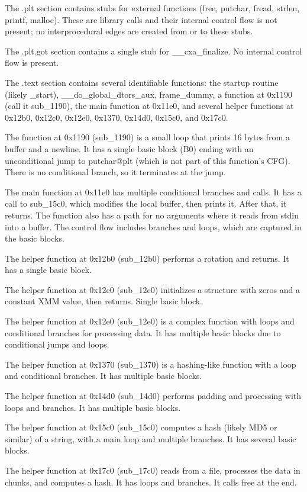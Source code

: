 The .plt section contains stubs for external functions (free, putchar, fread, strlen, printf, malloc). These are library calls and their internal control flow is not present; no interprocedural edges are created from or to these stubs.

The .plt.got section contains a single stub for \_\_cxa\_finalize. No internal control flow is present.

The .text section contains several identifiable functions: the startup routine (likely \_start), \_\_do\_global\_dtors\_aux, frame\_dummy, a function at 0x1190 (call it sub\_1190), the main function at 0x11e0, and several helper functions at 0x12b0, 0x12c0, 0x12e0, 0x1370, 0x14d0, 0x15c0, and 0x17c0.

The function at 0x1190 (sub\_1190) is a small loop that prints 16 bytes from a buffer and a newline. It has a single basic block (B0) ending with an unconditional jump to putchar@plt (which is not part of this function's CFG). There is no conditional branch, so it terminates at the jump.

The main function at 0x11e0 has multiple conditional branches and calls. It has a call to sub\_15c0, which modifies the local buffer, then prints it. After that, it returns. The function also has a path for no arguments where it reads from stdin into a buffer. The control flow includes branches and loops, which are captured in the basic blocks.

The helper function at 0x12b0 (sub\_12b0) performs a rotation and returns. It has a single basic block.

The helper function at 0x12c0 (sub\_12c0) initializes a structure with zeros and a constant XMM value, then returns. Single basic block.

The helper function at 0x12e0 (sub\_12e0) is a complex function with loops and conditional branches for processing data. It has multiple basic blocks due to conditional jumps and loops.

The helper function at 0x1370 (sub\_1370) is a hashing-like function with a loop and conditional branches. It has multiple basic blocks.

The helper function at 0x14d0 (sub\_14d0) performs padding and processing with loops and branches. It has multiple basic blocks.

The helper function at 0x15c0 (sub\_15c0) computes a hash (likely MD5 or similar) of a string, with a main loop and multiple branches. It has several basic blocks.

The helper function at 0x17c0 (sub\_17c0) reads from a file, processes the data in chunks, and computes a hash. It has loops and branches. It calls free at the end.

